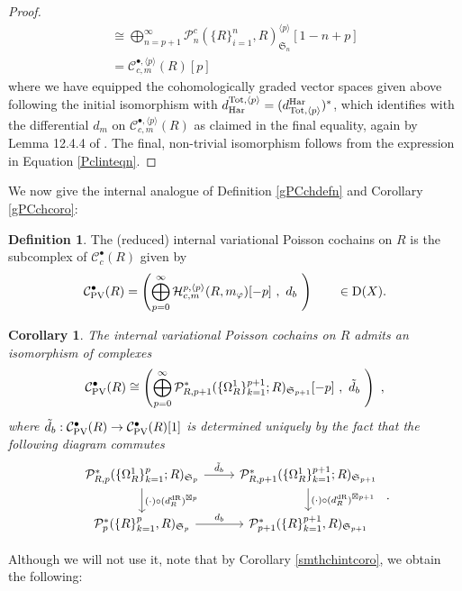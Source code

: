 \documentclass[11pt]{amsart}
\numberwithin{equation}{section}
\newtheorem{coro}[theo]{Corollary}
\theoremstyle{definition}
\newtheorem{defn}[theo]{Definition}
\newcommand{\mc}{\mathcal}
\newcommand{\mf}{\mathfrak}
\newcommand{\Har}{{\textup{Har}}}
\newcommand{\dR}{{\textup{dR}}}
\newcommand{\Ss}{{{\mf{S}}}}
\newcommand{\PV}{{{\textup{PV}}}}
\newcommand{\0}{{\textbf{0}}}
\newcommand{\Dd}{{\textup{D}}}
\def\PP{{\mc P}}
\def \mf{\mathfrak}
\begin{document}
\begin{proof}
\begin{align*}
	& \cong  \bigoplus_{n=p+1}^\infty \PP_n^c(\{R\}_{i=1}^n,R)^{\langle p \rangle}_{\Ss_{n}}[1-n+p] \\
	& = \mc C^{\bullet,\langle p \rangle}_{c,m}(R)[p] & 
\end{align*}
where we have equipped the cohomologically graded vector spaces given above following the initial isomorphism with $d_\Har^{\textup{Tot},\langle p \rangle }=(d^\Har_{\textup{Tot},\langle p \rangle })^*$, which identifies with the differential $d_m$ on $\mc C^{\bullet,\langle p \rangle}_{c,m}(R)$ as claimed in the final equality, again by Lemma 12.4.4 of \cite{LV}. The final, non-trivial isomorphism follows from the expression in Equation \ref{Pclinteqn}.



\end{proof}

We now give the internal analogue of Definition \ref{gPCchdefn} and Corollary \ref{gPCchcoro}:

\begin{defn}
The (reduced) internal variational Poisson cochains on $R$ is the subcomplex of $\mc C_c^\bullet(R)$ given by
\[ \mc C^\bullet_\PV(R)= \left( \bigoplus_{p=0}^\infty \mc H^{p,\langle p \rangle}_{c,m}(R,m_\varphi)[-p] \ , \ d_{b}  \ \right)  \qquad \in \Dd(X) .\]
\end{defn}


\begin{coro} The internal variational Poisson cochains on $R$ admits an isomorphism of complexes
	\[ \mc C^\bullet_\PV(R)\cong \left( \bigoplus_{p=0}^\infty \mc P^*_{R,p+1}(\{\Omega^1_R \}_{k=1}^{p+1};R)_{\Ss_{p+1}}[-p] \ , \ \tilde d_{b}  \ \right)  \ ,\]
	where $\tilde d_{b}:\mc C_\PV^\bullet(R)\to \mc C_\PV^\bullet(R)[1]$ is determined uniquely by the fact that the following diagram commutes
\begin{equation}\label{tildedbeqn}
		\begin{tikzcd}
		\mc P^*_{R,p}(\{\Omega^1_R \}_{k=1}^{p};R)_{\Ss_{p}} \arrow[r,"\tilde d_b"] \arrow[d," (\cdot)\circ (d_R^{\dR})^{\boxtimes p}"] & \mc P^*_{R,p+1}(\{\Omega^1_R \}_{k=1}^{p+1};R)_{\Ss_{p+1}}  \arrow[d," (\cdot)\circ (d_R^{\dR})^{\boxtimes p+1}"]\\
		\mc P^*_p(\{R\}_{k=1}^p,R)_{\Ss_{p}} \arrow[r,"d_b"]&  	\mc P^*_{p+1}(\{R\}_{k=1}^{p+1},R)_{\Ss_{p+1}} 	\end{tikzcd}  \ .
\end{equation}
\end{coro}


Although we will not use it, note that by Corollary \ref{smthchintcoro}, we obtain the following:
\end{document}
